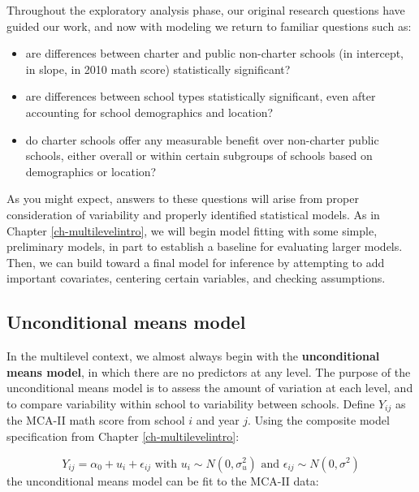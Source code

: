 \documentclass[
]{krantz}
\providecommand{\tightlist}{%
  \setlength{\itemsep}{0pt}\setlength{\parskip}{0pt}}
\begin{document}
Throughout the exploratory analysis phase, our original research questions have guided our work, and now with modeling we return to familiar questions such as:

\begin{itemize}
\tightlist
\item
  are differences between charter and public non-charter schools (in intercept, in slope, in 2010 math score) statistically significant?
\item
  are differences between school types statistically significant, even after accounting for school demographics and location?
\item
  do charter schools offer any measurable benefit over non-charter public schools, either overall or within certain subgroups of schools based on demographics or location?
\end{itemize}

As you might expect, answers to these questions will arise from proper consideration of variability and properly identified statistical models.
As in Chapter \ref{ch-multilevelintro}, we will begin model fitting with some simple, preliminary models, in part to establish a baseline for evaluating larger models. Then, we can build toward a final model for inference by attempting to add important covariates, centering certain variables, and checking assumptions.

\hypertarget{modela}{%
\subsection{Unconditional means model}\label{modela}}

In the multilevel context, we almost always begin with the \textbf{unconditional means model},  in which there are no predictors at any level. The purpose of the unconditional means model is to assess the amount of variation at each level, and to compare variability within school to variability between schools. Define \(Y_{ij}\) as the MCA-II math score from school \(i\) and year \(j\). Using the composite model specification from Chapter \ref{ch-multilevelintro}:

\begin{equation*}
Y _{ij} = \alpha_{0} + u_{i} + \epsilon_{ij} \textrm{ with } u_{i} \sim N(0, \sigma^2_u) \textrm{ and } \epsilon_{ij} \sim N(0, \sigma^2)
\end{equation*}
the unconditional means model can be fit to the MCA-II data:
\end{document}
